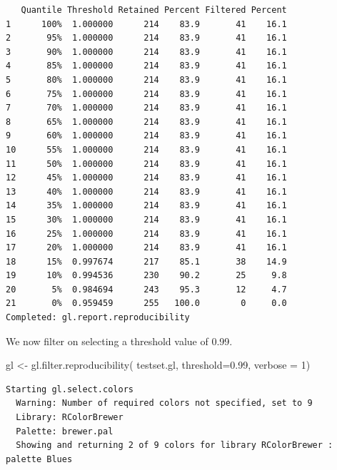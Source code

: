 \documentclass[
  letterpaper,
  DIV=11,
  numbers=noendperiod]{scrreprt}
\newenvironment{Shaded}{\begin{snugshade}}{\end{snugshade}}
\newcommand{\AttributeTok}[1]{\textcolor[rgb]{0.49,0.56,0.16}{#1}}
\newcommand{\DecValTok}[1]{\textcolor[rgb]{0.25,0.63,0.44}{#1}}
\newcommand{\FloatTok}[1]{\textcolor[rgb]{0.25,0.63,0.44}{#1}}
\newcommand{\FunctionTok}[1]{\textcolor[rgb]{0.02,0.16,0.49}{#1}}
\newcommand{\NormalTok}[1]{\textcolor[rgb]{0.00,0.44,0.13}{#1}}
\newcommand{\OtherTok}[1]{\textcolor[rgb]{0.00,0.44,0.13}{#1}}
\let\textttOrig\texttt
\renewcommand{\texttt}[1]{\textttOrig{\color{blue}{#1}}}
\begin{document}
\begin{verbatim}
   Quantile Threshold Retained Percent Filtered Percent
1      100%  1.000000      214    83.9       41    16.1
2       95%  1.000000      214    83.9       41    16.1
3       90%  1.000000      214    83.9       41    16.1
4       85%  1.000000      214    83.9       41    16.1
5       80%  1.000000      214    83.9       41    16.1
6       75%  1.000000      214    83.9       41    16.1
7       70%  1.000000      214    83.9       41    16.1
8       65%  1.000000      214    83.9       41    16.1
9       60%  1.000000      214    83.9       41    16.1
10      55%  1.000000      214    83.9       41    16.1
11      50%  1.000000      214    83.9       41    16.1
12      45%  1.000000      214    83.9       41    16.1
13      40%  1.000000      214    83.9       41    16.1
14      35%  1.000000      214    83.9       41    16.1
15      30%  1.000000      214    83.9       41    16.1
16      25%  1.000000      214    83.9       41    16.1
17      20%  1.000000      214    83.9       41    16.1
18      15%  0.997674      217    85.1       38    14.9
19      10%  0.994536      230    90.2       25     9.8
20       5%  0.984694      243    95.3       12     4.7
21       0%  0.959459      255   100.0        0     0.0
Completed: gl.report.reproducibility 
\end{verbatim}

We now filter on selecting a threshold value of 0.99.

\begin{Shaded}
\begin{Highlighting}[]
\NormalTok{gl }\OtherTok{\textless{}{-}} \FunctionTok{gl.filter.reproducibility}\NormalTok{( testset.gl, }\AttributeTok{threshold=}\FloatTok{0.99}\NormalTok{, }\AttributeTok{verbose =} \DecValTok{1}\NormalTok{)}
\end{Highlighting}
\end{Shaded}

\begin{verbatim}
Starting gl.select.colors 
  Warning: Number of required colors not specified, set to 9
  Library: RColorBrewer
  Palette: brewer.pal
  Showing and returning 2 of 9 colors for library RColorBrewer : palette Blues 
\end{verbatim}

\begin{figure}[H]

{\centering \texttt{[image: basicfiltering\_files/figure-pdf/unnamed-chunk-3-1.pdf]}

}

\end{figure}
\end{document}
